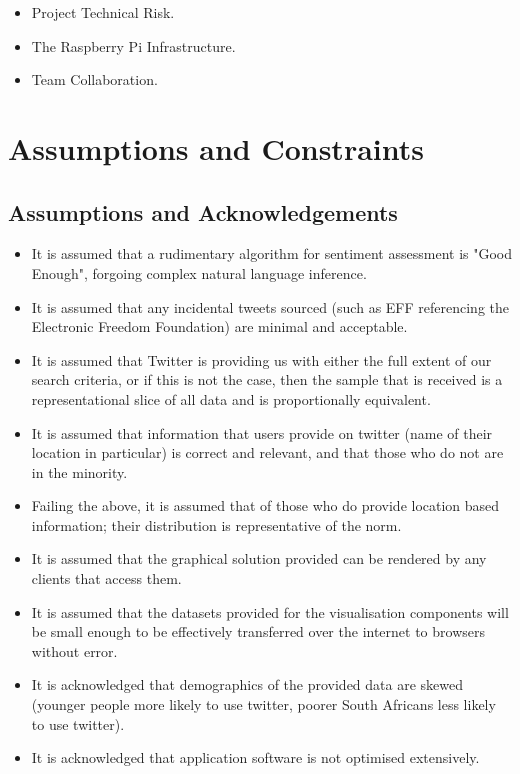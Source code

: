 \documentclass[12pt]{article} %
\begin{document}
\begin{itemize}
	\item Project Technical Risk.
	\item The Raspberry Pi Infrastructure.
	\item Team Collaboration.
\end{itemize}
	
	\section{Assumptions and Constraints}
	
\subsection{Assumptions and Acknowledgements}

\begin{itemize}
	
	
	\item It is assumed that a rudimentary algorithm for sentiment assessment is "Good Enough", forgoing complex natural language inference. 
	
	\item It is assumed that any incidental tweets sourced (such as EFF referencing the Electronic Freedom Foundation) are minimal and acceptable.
	
	\item It is assumed that Twitter is providing us with either the full extent of our search criteria, or if this is not the case, then the sample that is received is a representational slice of all data and is proportionally equivalent.
	
	\item It is assumed that information that users provide on twitter (name of their location in particular) is correct and relevant, and that those who do not are in the minority.
	
	\item Failing the above, it is assumed that of those who do provide location based information; their distribution is representative of the norm.
	
	\item It is assumed that the graphical solution provided can be rendered by any clients that access them.
	
	\item It is assumed that the datasets provided for the visualisation components will be small enough to be effectively transferred over the internet to browsers without error.
	
	\item It is acknowledged that demographics of the provided data are skewed (younger people more likely to use twitter, poorer South Africans less likely to use twitter).
	
	\item It is acknowledged that application software is not optimised extensively.
\end{itemize}
\end{document}
